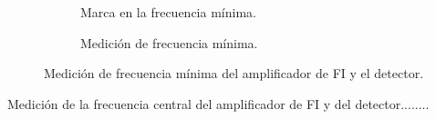     \begin{figure}[H]
      \centering
      \begin{subfigure}[ht]{0.48\textwidth}
        \caption{Marca en la frecuencia mínima.}
        \label{fig:FrecuenciaMinFI_Osc}
      \end{subfigure}
      \hfill 
      \begin{subfigure}[ht]{0.48\textwidth}
        \caption{Medición de frecuencia mínima.}
        \label{fig:FrecuneciaMinFI_Gener}
      \end{subfigure}

      \caption{Medición de frecuencia mínima del amplificador de FI y el detector.}
      \label{fig:FrecuenciaMinFI}
    \end{figure}

    Medición de la frecuencia central del amplificador de FI y del detector........

